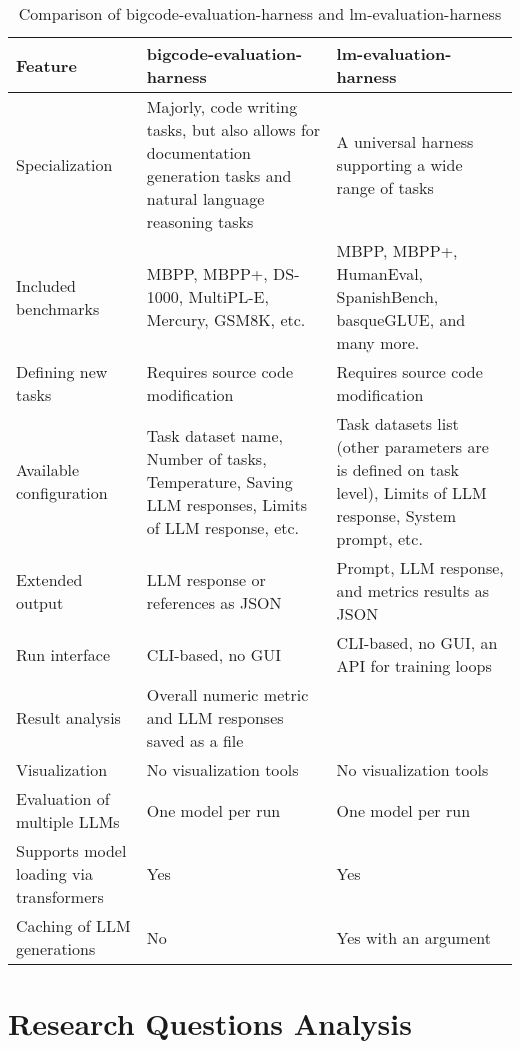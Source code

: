 \begin{table}[H]
    \centering
    \begin{tabular}{|p{4cm}|p{5cm}|p{5cm}|}
        \hline
        \textbf{Feature} & \textbf{bigcode-evaluation-harness} & \textbf{lm-evaluation-harness} \\
        \hline
        Specialization & Majorly, code writing tasks, but also allows for documentation generation tasks and natural language reasoning tasks & A universal harness supporting a wide range of tasks \\
        \hline
        Included benchmarks & MBPP, MBPP+, DS-1000, MultiPL-E, Mercury, GSM8K, etc. & MBPP, MBPP+, HumanEval, SpanishBench, basqueGLUE, and many more. \\
        \hline
        Defining new tasks & Requires source code modification & Requires source code modification \\
        \hline
        Available configuration & Task dataset name, Number of tasks, Temperature, Saving LLM responses, Limits of LLM response, etc. & Task datasets list (other parameters are is defined on task level), Limits of LLM response, System prompt, etc.  \\
        \hline
        Extended output & LLM response or references as JSON & Prompt, LLM response, and metrics results as JSON \\
        \hline
        Run interface & CLI-based, no GUI & CLI-based, no GUI, an API for training loops \\
        \hline
        Result analysis & Overall numeric metric and LLM responses saved as a file &  \\
        \hline
        Visualization & No visualization tools & No visualization tools \\
        \hline
        Evaluation of multiple LLMs & One model per run & One model per run \\
        \hline
        Supports model loading via transformers & Yes & Yes \\
        \hline
        Caching of LLM generations & No & Yes with an argument \\
        \hline
    \end{tabular}
    \caption{Comparison of bigcode-evaluation-harness and lm-evaluation-harness}
    \label{tab:framework-comparison}
\end{table}


\section{Research Questions Analysis}

